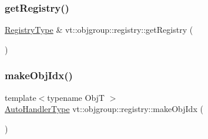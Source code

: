 \mbox{\label{namespacevt_1_1objgroup_1_1registry_a6aaccd35cb1d15d28d505c2fa4aad3e3}} 
\subsubsection{\texorpdfstring{get\+Registry()}{getRegistry()}}
{\footnotesize\ttfamily \hyperlink{namespacevt_1_1objgroup_1_1registry_abefb624bedde3ece3acdd759934ce541}{Registry\+Type} \& vt\+::objgroup\+::registry\+::get\+Registry (\begin{DoxyParamCaption}{ }\end{DoxyParamCaption})\hspace{0.3cm}{\ttfamily [inline]}}

\mbox{\label{namespacevt_1_1objgroup_1_1registry_aa614a5ba15bf7eebf585b253f20f40af}} 
\subsubsection{\texorpdfstring{make\+Obj\+Idx()}{makeObjIdx()}}
{\footnotesize\ttfamily template$<$typename ObjT $>$ \\
\hyperlink{namespacevt_1_1objgroup_1_1registry_ab61bb18a54c83c090d49a1a7f6f30037}{Auto\+Handler\+Type} vt\+::objgroup\+::registry\+::make\+Obj\+Idx (\begin{DoxyParamCaption}{ }\end{DoxyParamCaption})\hspace{0.3cm}{\ttfamily [inline]}}

